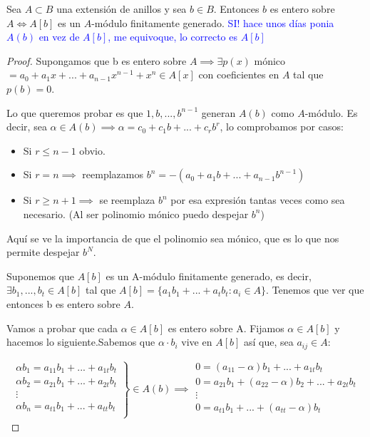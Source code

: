 \begin{prop}
	Sea $A\subset B$ una extensión de anillos y sea $b \in B$. Entonces $b$ es entero sobre $A \Leftrightarrow A[b]$ es un $A$-módulo finitamente generado. \textcolor{blue}{SI! hace unos días ponia $A(b)$ en vez de $A[b]$, me equivoque, lo correcto es $A[b]$}
\end{prop}

\begin{proof}

	\proofpart{$\implies$}

	Supongamos que b es entero sobre $A \implies \exists p(x)$ mónico $= a_0+a_1x+...+a_{n-1}x^{n-1}+x^n \in A[x]$ con coeficientes en $A$ tal que $p(b)=0$.

	Lo que queremos probar es que $1,b,...,b^{n-1}$ generan $A(b)$ como $A$-módulo. Es decir, sea $\alpha \in A(b) \implies \alpha=c_0+c_1b+...+c_rb^r$, lo comprobamos por casos:
	\begin{itemize}
		\item Si $r \leq n-1$ obvio.
		\item Si $r = n \implies$ reemplazamos $b^n=-(a_0+a_1b+...+a_{n-1}b^{n-1})$
		\item Si $r \geq n+1 \implies$ se reemplaza $b^n$ por esa expresión tantas veces como sea necesario. (Al ser polinomio mónico puedo despejar $b^n$)
	\end{itemize}

	Aquí se ve la importancia de que el polinomio sea mónico, que es lo que nos permite despejar $b^N$.

	\proofpart{$\Leftarrow$}

	Suponemos que $A[b]$ es un A-módulo finitamente generado, es decir, $\exists b_1,...,b_t \in A[b]$ tal que $A[b]=\{ a_1b_1+...+a_tb_t: a_i \in A \}$. Tenemos que ver que entonces b es entero sobre $A$.

	Vamos a probar que cada $\alpha \in A[b]$ es entero sobre A. Fijamos $\alpha \in A[b]$ y hacemos lo siguiente.Sabemos que $\alpha\cdot b_i$ vive en $A[b]$ así que,  sea $a_{ij}\in A$:

	\[
	\left. \begin{array}{c}
	\alpha b_1=a_{11}b_1+...+a_{1t}b_t \\
	\alpha b_2=a_{21}b_1+...+a_{2t}b_t \\
	\vdots \\
	\alpha b_n=a_{t1}b_1+...+a_{tt}b_t \\
	\end{array}
	\right\} \in A(b) \implies
	\begin{array}{c}
	0=(a_{11}-\alpha)b_1+...+a_{1t}b_t \\
	0=a_{21}b_1+(a_{22}-\alpha)b_2+...+a_{2t}b_t \\
	\vdots \\
	0=a_{t1}b_1+...+(a_{tt}-\alpha)b_t \\
	\end{array}
	\]


\end{proof}
